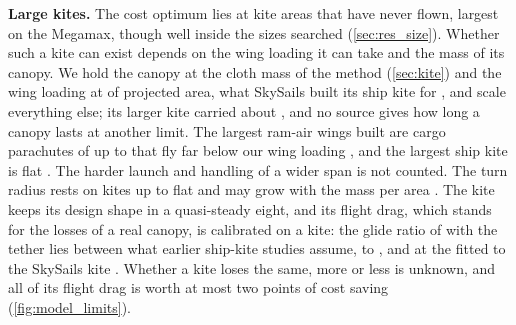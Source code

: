 
\textbf{Large kites.} The cost optimum lies at kite areas that have never flown, largest on the Megamax, though well inside the sizes searched (\cref{sec:res_size}). Whether such a kite can exist depends on the wing loading it can take and the mass of its canopy. We hold the canopy at the cloth mass of the method (\cref{sec:kite}) and the wing loading at  of projected area, what SkySails built its ship kite for \citep{paulig2013}, and scale everything else; its larger kite carried about  \citep{paulig2013,skysails2018}, and no source gives how long a canopy lasts at another limit. The largest ram-air wings built are cargo parachutes of up to  that fly far below our wing loading \citep{dunker2013}, and the largest ship kite is  flat \citep{fritz2013,skysails2018}. The harder launch and handling of a wider span is not counted. The turn radius rests on kites up to  flat and may grow with the mass per area \citep{erhard2013b}. The kite keeps its design shape in a quasi-steady eight, and its flight drag, which stands for the losses of a real canopy, is calibrated on a  kite: the glide ratio of  with the tether lies between what earlier ship-kite studies assume,  \citep{traut2014} to  \citep{podeur2016}, and at the  fitted to the  SkySails kite \citep{erhard2013b}. Whether a  kite loses the same, more or less is unknown, and all of its flight drag is worth at most two points of cost saving (\cref{fig:model_limits}).

